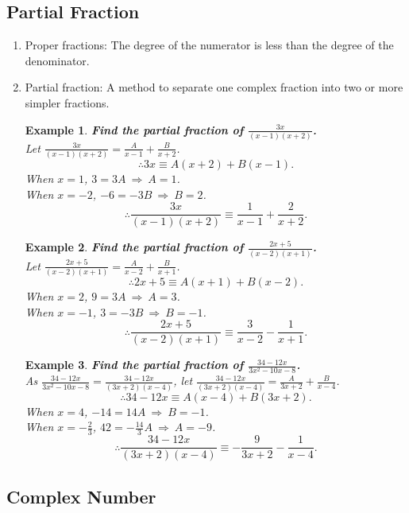 \documentclass[12pt, a4paper]{article}
\newtheorem{example}{Example}[subsection]
\begin{document}
\subsection{Partial Fraction}
\begin{enumerate}
  \item Proper fractions: The degree of the numerator is less than the degree of the denominator. 
  \item Partial fraction: A method to separate one complex fraction into two or more simpler fractions. 
  \begin{example}
    \textbf{Find the partial fraction of $\frac{3x}{(x-1)(x+2)}$.}\\
    Let $\frac{3x}{(x-1)(x+2)}=\frac{A}{x-1}+\frac{B}{x+2}$.
    $$\therefore 3x \equiv A(x+2)+B(x-1).$$
    When $x=1$, $3=3A\ \Rightarrow\ A=1$. \\
    When $x=-2$, $-6=-3B\ \Rightarrow\ B=2$. 
    $$\therefore \frac{3x}{(x-1)(x+2)} \equiv \frac{1}{x-1}+\frac{2}{x+2}.$$
  \end{example}
  \begin{example}
    \textbf{Find the partial fraction of $\frac{2x+5}{(x-2)(x+1)}$.}\\
    Let $\frac{2x+5}{(x-2)(x+1)}=\frac{A}{x-2}+\frac{B}{x+1}$.
    $$\therefore 2x+5 \equiv A(x+1)+B(x-2).$$
    When $x=2$, $9=3A\ \Rightarrow\ A=3$. \\
    When $x=-1$, $3=-3B\ \Rightarrow\ B=-1$. 
    $$\therefore \frac{2x+5}{(x-2)(x+1)}\equiv\frac{3}{x-2}-\frac{1}{x+1}.$$
  \end{example}
  \begin{example}
    \textbf{Find the partial fraction of $\frac{34-12x}{3x^2-10x-8}$.}\\
    As $\frac{34-12x}{3x^2-10x-8}=\frac{34-12x}{(3x+2)(x-4)}$, let $\frac{34-12x}{(3x+2)(x-4)}=\frac{A}{3x+2}+\frac{B}{x-4}$.
    $$\therefore 34-12x \equiv A(x-4)+B(3x+2).$$
    When $x=4$, $-14=14A\ \Rightarrow\ B=-1$. \\
    When $x=-\frac{2}{3}$, $42=-\frac{14}{3}A\ \Rightarrow\ A=-9$. 
    $$\therefore \frac{34-12x}{(3x+2)(x-4)}\equiv-\frac{9}{3x+2}-\frac{1}{x-4}.$$
  \end{example}
\end{enumerate}

\subsection{Complex Number}
\end{document}
